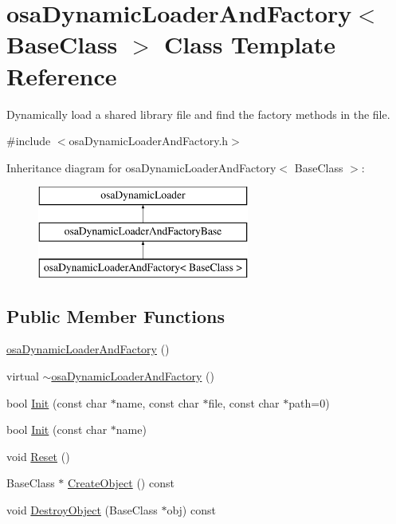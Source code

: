 \hypertarget{classosa_dynamic_loader_and_factory}{\section{osa\-Dynamic\-Loader\-And\-Factory$<$ Base\-Class $>$ Class Template Reference}
\label{classosa_dynamic_loader_and_factory}
}


Dynamically load a shared library file and find the factory methods in the file.  




{\ttfamily \#include $<$osa\-Dynamic\-Loader\-And\-Factory.\-h$>$}

Inheritance diagram for osa\-Dynamic\-Loader\-And\-Factory$<$ Base\-Class $>$\-:\begin{figure}[H]
\begin{center}
\leavevmode
\includegraphics[height=3.000000cm]{da/d80/classosa_dynamic_loader_and_factory}
\end{center}
\end{figure}
\subsection*{Public Member Functions}
\begin{DoxyCompactItemize}
\item 
\hyperlink{classosa_dynamic_loader_and_factory_a62c5ebb6a73695309d35e234c5364aca}{osa\-Dynamic\-Loader\-And\-Factory} ()
\item 
virtual \hyperlink{classosa_dynamic_loader_and_factory_a89a5ed41795886528c8be5174b414eb0}{$\sim$osa\-Dynamic\-Loader\-And\-Factory} ()
\item 
bool \hyperlink{classosa_dynamic_loader_and_factory_ad8fe0ce199004dc602e8e2c445aedd1a}{Init} (const char $\ast$name, const char $\ast$file, const char $\ast$path=0)
\item 
bool \hyperlink{classosa_dynamic_loader_and_factory_a8cf38f618bf61e039dbc9eef49897900}{Init} (const char $\ast$name)
\item 
void \hyperlink{classosa_dynamic_loader_and_factory_a99c410f1a99f8b332a5741e6f86bb467}{Reset} ()
\item 
Base\-Class $\ast$ \hyperlink{classosa_dynamic_loader_and_factory_a5d98120e99e856ede533caeb4497ec0e}{Create\-Object} () const 
\item 
void \hyperlink{classosa_dynamic_loader_and_factory_a395ef97059b8b948cfa040a15644857e}{Destroy\-Object} (Base\-Class $\ast$obj) const 
\end{DoxyCompactItemize}
